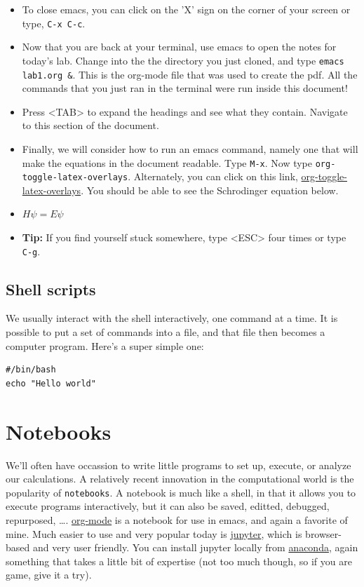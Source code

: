 \documentclass[11pt]{article}
\begin{document}
\begin{itemize}
\item To close emacs, you can click on the 'X' sign on the corner of your screen or type, \texttt{C-x C-c}.

\item Now that you are back at your terminal, use emacs to open the notes for today's lab. Change into the the directory you just cloned, and type \texttt{emacs lab1.org \&}. This is the org-mode file that was used to create the pdf. All the commands that you just ran in the terminal were run inside this document!

\item Press <TAB> to expand the headings and see what they contain. Navigate to this section of the document.

\item Finally, we will consider how to run an emacs command, namely one that will make the equations in the document readable. Type \texttt{M-x}. Now type \texttt{org-toggle-latex-overlays}. Alternately, you can click on this link, \url{org-toggle-latex-overlays}. You should be able to see the Schrodinger equation below.

\item \(H\psi = E\psi\)

\item \textbf{Tip:} If you find yourself stuck somewhere, type <ESC> four times or type \texttt{C-g}.
\end{itemize}


\subsection{Shell scripts}
\label{sec:org384139f}
We usually interact with the shell interactively, one command at a time.  It is possible
to put a set of commands into a file, and that file then becomes a computer program.
Here's a super simple one:

\begin{verbatim}
#/bin/bash
echo "Hello world"
\end{verbatim}

\section{Notebooks}
\label{sec:org848261b}
We'll often have occassion to write little programs to set up, execute, or analyze our
calculations.  A relatively recent innovation in the computational world is the popularity
of \texttt{notebooks}. A notebook is much like a shell, in that it allows you to execute programs
interactively, but it can also be saved, editted, debugged, repurposed, \ldots{}.  \href{https://orgmode.org/}{org-mode} is
a notebook for use in emacs, and again a favorite of mine.  Much easier to use and very
popular today is \href{https://jupyter.org/}{jupyter}, which is browser-based and very user friendly.  You can install
jupyter locally from \href{https://www.anaconda.com/distribution/}{anaconda}, again something that takes a little bit of expertise (not
too much though, so if you are game, give it a try).
\end{document}
